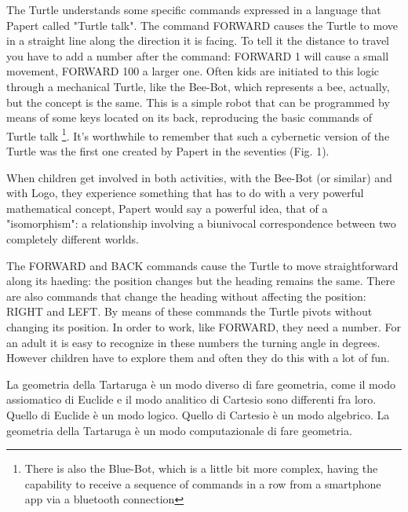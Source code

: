 The Turtle understands some specific commands expressed in a language that Papert called "Turtle talk". The command FORWARD causes the Turtle to move in a straight line along the direction it is facing. To tell it the distance to travel you have to add a number after the command: FORWARD 1  will cause a small movement, FORWARD 100 a larger one. Often kids are initiated to this logic through a mechanical Turtle, like the Bee-Bot, which represents a bee, actually, but the concept is the same. This is a simple robot that can be programmed by means of some keys located on its back, reproducing the basic commands of Turtle talk \footnote{There is also the Blue-Bot, which is a little bit more complex, having the capability to receive a sequence of commands in a row from a smartphone app via a bluetooth connection}. It's worthwhile to remember that such a cybernetic version of the Turtle was the first one created by Papert in the seventies (Fig. 1). 

When children get involved in both activities, with the Bee-Bot (or similar) and with Logo, they experience something that has to do with a very powerful mathematical concept, Papert would say a powerful idea, that of a "isomorphism": a relationship involving a biunivocal correspondence between two completely different worlds.

The FORWARD and BACK commands cause the Turtle to move straightforward along its haeding: the position changes but the heading remains the same. There are also commands that change the heading without affecting the position: RIGHT and LEFT. By means of these commands the Turtle pivots without changing its position. In order to work, like FORWARD, they need a number. For an adult it is easy to recognize in these numbers the turning angle in degrees. However children have to explore them and often they do this with a lot of fun.





La geometria della Tartaruga è un modo diverso di fare geometria, come il modo assiomatico di Euclide e il modo analitico di Cartesio sono differenti fra loro. Quello di Euclide è un modo logico. Quello di Cartesio è un modo algebrico. La geometria della Tartaruga è un modo computazionale di fare geometria.

